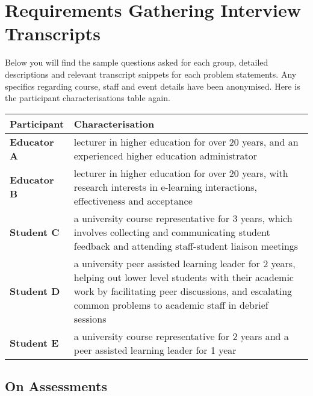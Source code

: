 
\chapter{Requirements Gathering Interview Transcripts}

Below you will find the sample questions asked for each group, detailed descriptions and relevant transcript 
snippets for each problem statements. 
Any specifics regarding course, staff and event details have been anonymised.
Here is the participant characterisations table again.

\begin{table}[!h] 
    \centering
    \begin{tabularx}{\textwidth}{>{\bfseries}lX}
        Participant & Characterisation\\
        \toprule
        Educator A & lecturer in higher education for over 20 years, and an experienced higher education 
        administrator\\\midrule
        Educator B & lecturer in higher education for over 20 years, with research interests 
        in e-learning interactions, effectiveness and acceptance\\\midrule
        Student C & a university course representative for 3 years, which involves collecting and 
        communicating student feedback and attending staff-student liaison meetings \\\midrule
        Student D & a university peer assisted learning leader for 2 years, helping out lower level 
        students with their academic work by facilitating peer discussions, and escalating common problems
        to academic staff in debrief sessions\\\midrule
        Student E & a university course representative for 2 years and a peer assisted learning leader 
        for 1 year\\\bottomrule
    \end{tabularx}
\end{table}

\section{On Assessments}

